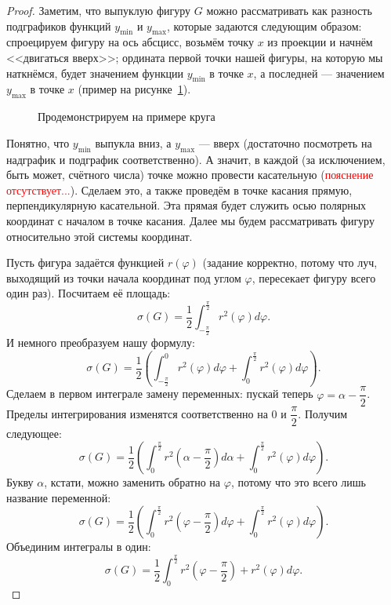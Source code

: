 \begin{proof}
	Заметим, что выпуклую фигуру \(G\) можно рассматривать как разность подграфиков функций \(y_{\min}\) и \(y_{\max}\),  которые задаются следующим образом: спроецируем фигуру на ось абсцисс, возьмём точку \(x\) из проекции и начнём <<двигаться вверх>>; ордината первой точки нашей фигуры, на которую мы наткнёмся, будет значением функции \(y_{\min}\) в точке \(x\), а последней --- значением  \(y_{\max}\) в точке \(x\) (пример на рисунке~\ref{kroog}).
	\begin{figure}[h!]
		\caption{Продемонстрируем на примере круга}
		\label{kroog}
	\end{figure}
	
	Понятно, что \(y_{\min}\) выпукла вниз, а \(y_{\max}\) --- вверх (достаточно посмотреть на надграфик и подграфик соответственно). А значит, в каждой (за исключением, быть может, счётного числа) точке можно провести касательную (\textcolor{red}{пояснение отсутствует...}). Сделаем это, а также проведём в точке касания прямую, перпендикулярную касательной. Эта прямая будет служить осью полярных координат с началом в точке касания. Далее мы будем рассматривать фигуру относительно этой системы координат.
	
	Пусть фигура задаётся функцией \(r(\varphi)\) (задание корректно, потому что луч, выходящий из точки начала координат под углом \(\varphi\), пересекает фигуру всего один раз). Посчитаем её площадь: \[
	\sigma(G) = \frac{1}{2} \int_{-\frac{\pi}{2}}^{\frac{\pi}{2}} r^2(\varphi) d\varphi.
	\]
	И немного преобразуем нашу формулу: \[
	\sigma(G) = \frac{1}{2} \left(\int_{-\frac{\pi}{2}}^{0} r^2(\varphi) d\varphi + \int_{0}^{\frac{\pi}{2}} r^2(\varphi) d\varphi \right).
	\]
	Сделаем в первом интеграле замену переменных: пускай теперь \(\varphi = \alpha - \dfrac{\pi}{2}\). Пределы интегрирования изменятся соответственно на \(0\) и \(\dfrac{\pi}{2}\). Получим следующее: \[
	\sigma(G) = \frac{1}{2} \left(\int_{0}^{\frac{\pi}{2}} r^2 \left(\alpha - \frac{\pi}{2} \right) d\alpha + \int_{0}^{\frac{\pi}{2}} r^2(\varphi) d\varphi \right).
	\]
	Букву \(\alpha\), кстати, можно заменить обратно на \(\varphi\), потому что это всего лишь название переменной: \[
	\sigma(G) = \frac{1}{2} \left(\int_{0}^{\frac{\pi}{2}} r^2 \left(\varphi - \frac{\pi}{2} \right) d\varphi + \int_{0}^{\frac{\pi}{2}} r^2(\varphi) d\varphi \right).
	\]
	Объединим интегралы в один: \[
	\sigma(G) = \frac{1}{2} \int_{0}^{\frac{\pi}{2}} r^2 \left(\varphi - \frac{\pi}{2} \right) +  r^2(\varphi) d\varphi.
	\]
	

\end{proof}
